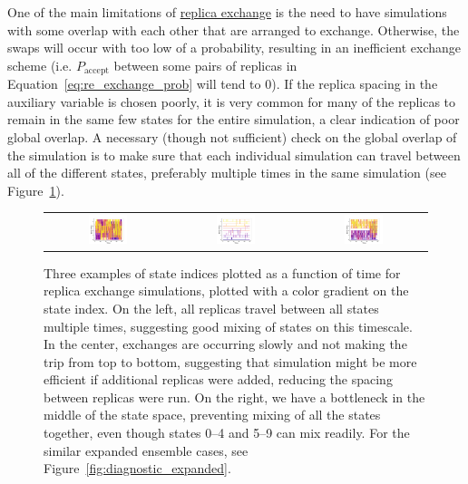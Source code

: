 \documentclass[9pt,review]{livecoms}
\begin{document}
One of the main limitations of \hyperlink{ref:ReplEx} {replica exchange} is the need to have simulations with some overlap with each other that are arranged to exchange. Otherwise, the swaps will occur with too low of a probability, resulting in an inefficient exchange scheme (i.e. $P_\mathrm{accept}$ between some pairs of replicas in Equation~\ref{eq:re_exchange_prob} will tend to $0$). If the replica spacing in the auxiliary variable is chosen poorly, it is very common for many of the replicas to remain in the same few states for the entire simulation, a clear indication of poor global overlap. A necessary (though not sufficient) check on the global overlap of the simulation is to make sure that each individual simulation can travel between all of the different states, preferably multiple times in the same simulation (see Figure~\ref{fig:diagnostic_replica}).

\begin{figure}[!ht]
    \centering
\begin{tabular}{c|c|c}
\includegraphics[width=0.33\textwidth]{Figures/diagnostic_figures/goodmixing.png} & \includegraphics[width=0.33\textwidth]{Figures/diagnostic_figures/slowmixing.png}&
\includegraphics[width=0.33\textwidth]{Figures/diagnostic_figures/sepmixing.png}
\end{tabular}
    \caption{Three examples of state indices plotted as a function of time for replica exchange simulations, plotted with a color gradient on the state index.  On the left, all replicas travel between all states multiple times, suggesting good mixing of states on this timescale.  In the center, exchanges are occurring slowly and not making the trip from top to bottom, suggesting that simulation might be more efficient if additional replicas were added, reducing the spacing between replicas were run. On the right, we have a bottleneck in the middle of the state space, preventing mixing of all the states together, even though states 0--4 and 5--9 can mix readily. For the similar expanded ensemble cases, see Figure~\ref{fig:diagnostic_expanded}.}
    \label{fig:diagnostic_replica}
\end{figure}
\end{document}

